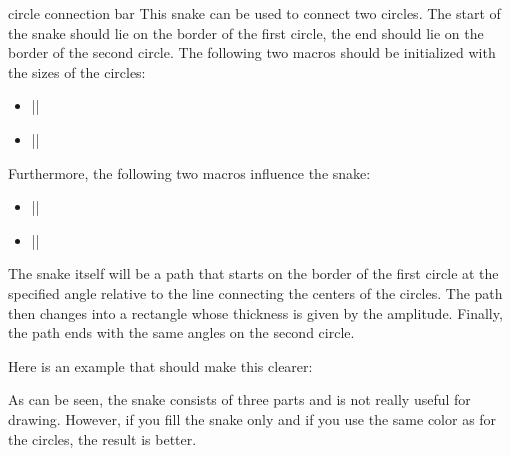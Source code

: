 \begin{snake}{circle connection bar}
  This snake can be used to connect two circles. The start of the
  snake should lie on the border of the first circle, the end should
  lie on the border of the second circle. The following two macros should be
  initialized with the sizes of the circles:
  \begin{itemize}
  \item |\pgfsnakecirclestartradius|
  \item |\pgfsnakecircleendradius|
  \end{itemize}
  Furthermore, the following two macros influence the snake:
  \begin{itemize}
  \item |\pgfsnakesegmentamplitude|
  \item |\pgfsnakesegmentangle|
  \end{itemize}
  The snake itself will be a path that starts on the border of the
  first circle at the specified angle relative to the line connecting
  the centers of the circles. The path then changes into a rectangle
  whose thickness is given by the amplitude. Finally, the path ends
  with the same angles on the second circle. 

  Here is an example that should make this clearer:
\begin{codeexample}[]
\end{codeexample}

  As can be seen, the snake consists of three parts and is not really
  useful for drawing. However, if you fill the snake only and if you
  use the same color as for the circles, the result is better.
\begin{codeexample}[]
\end{codeexample}
\end{snake}
